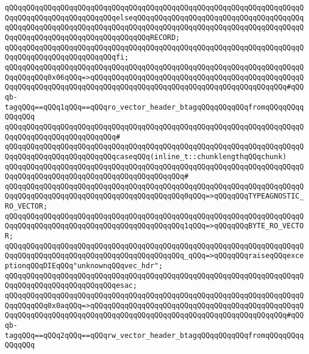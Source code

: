 \verb|qQQqqQQqqQQqqQQqqQQqqQQqqQQqqQQqqQQqqQQqqQQqqQQqqQQqqQQqqQQqqQQqqQQqqQQqqQQqqQQqqQQqqQQqqQQqqQQqelseqQQqqQQqqQQqqQQqqQQqqQQqqQQqqQQqqQQqqQQqqQQqqQQqqQQqqQQqqQQqqQQqqQQqqQQqqQQqqQQqqQQqqQQqqQQqqQQqqQQqqQQqqQQqqQQqqQQqqQQqqQQqqQQqqQQqqQQqqQQqqQQqRECORD;|\newline
\verb|qQQqqQQqqQQqqQQqqQQqqQQqqQQqqQQqqQQqqQQqqQQqqQQqqQQqqQQqqQQqqQQqqQQqqQQqqQQqqQQqqQQqqQQqqQQqqQQqfi;|\newline
\newline
\verb|qQQqqQQqqQQqqQQqqQQqqQQqqQQqqQQqqQQqqQQqqQQqqQQqqQQqqQQqqQQqqQQqqQQqqQQqqQQqqQQq0x06qQQq=>qQQqqQQqqQQqqQQqqQQqqQQqqQQqqQQqqQQqqQQqqQQqqQQqqQQqqQQqqQQqqQQqqQQqqQQqqQQqqQQqqQQqqQQqqQQqqQQqqQQqqQQqqQQqqQQqqQQq#qQQqb-tagqQQq==qQQq1qQQq==qQQqro_vector_header_btagqQQqqQQqqQQqfromqQQqqQQqqQQqqQQq|\newline
\verb|qQQqqQQqqQQqqQQqqQQqqQQqqQQqqQQqqQQqqQQqqQQqqQQqqQQqqQQqqQQqqQQqqQQqqQQqqQQqqQQqqQQqqQQqqQQqqQQq#|\newline
\verb|qQQqqQQqqQQqqQQqqQQqqQQqqQQqqQQqqQQqqQQqqQQqqQQqqQQqqQQqqQQqqQQqqQQqqQQqqQQqqQQqqQQqqQQqqQQqqQQqcaseqQQq(inline_t::chunklengthqQQqchunk)|\newline
\verb|qQQqqQQqqQQqqQQqqQQqqQQqqQQqqQQqqQQqqQQqqQQqqQQqqQQqqQQqqQQqqQQqqQQqqQQqqQQqqQQqqQQqqQQqqQQqqQQqqQQqqQQqqQQqqQQq#|\newline
\verb|qQQqqQQqqQQqqQQqqQQqqQQqqQQqqQQqqQQqqQQqqQQqqQQqqQQqqQQqqQQqqQQqqQQqqQQqqQQqqQQqqQQqqQQqqQQqqQQqqQQqqQQqqQQqqQQq0qQQq=>qQQqqQQqTYPEAGNOSTIC_RO_VECTOR;|\newline
\verb|qQQqqQQqqQQqqQQqqQQqqQQqqQQqqQQqqQQqqQQqqQQqqQQqqQQqqQQqqQQqqQQqqQQqqQQqqQQqqQQqqQQqqQQqqQQqqQQqqQQqqQQqqQQqqQQq1qQQq=>qQQqqQQqBYTE_RO_VECTOR;|\newline
\verb|qQQqqQQqqQQqqQQqqQQqqQQqqQQqqQQqqQQqqQQqqQQqqQQqqQQqqQQqqQQqqQQqqQQqqQQqqQQqqQQqqQQqqQQqqQQqqQQqqQQqqQQqqQQqqQQq_qQQq=>qQQqqQQqraiseqQQqexceptionqQQqDIEqQQq"unknownqQQqvec_hdr";|\newline
\verb|qQQqqQQqqQQqqQQqqQQqqQQqqQQqqQQqqQQqqQQqqQQqqQQqqQQqqQQqqQQqqQQqqQQqqQQqqQQqqQQqqQQqqQQqqQQqqQQqesac;|\newline
\newline
\newline
\verb|qQQqqQQqqQQqqQQqqQQqqQQqqQQqqQQqqQQqqQQqqQQqqQQqqQQqqQQqqQQqqQQqqQQqqQQqqQQqqQQq0x0aqQQq=>qQQqqQQqqQQqqQQqqQQqqQQqqQQqqQQqqQQqqQQqqQQqqQQqqQQqqQQqqQQqqQQqqQQqqQQqqQQqqQQqqQQqqQQqqQQqqQQqqQQqqQQqqQQqqQQqqQQq#qQQqb-tagqQQq==qQQq2qQQq==qQQqrw_vector_header_btagqQQqqQQqqQQqfromqQQqqQQqqQQqqQQq|\newline

